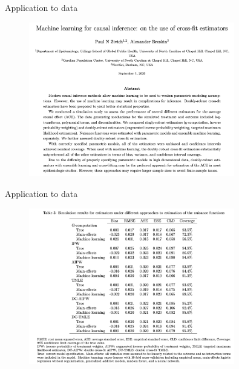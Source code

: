 \documentclass[xcolor={table}]{beamer}
\begin{document}
\begin{frame}{Application to data}
\cite{zivich2021machine}

\begin{figure}
\centering
\includegraphics[width = 0.8\textwidth]{../assets/zivich-breskin.png}
\end{figure}
\hfill
\end{frame}



\begin{frame}{Application to data}
\cite{zivich2021machine}

\begin{figure}
\centering
\includegraphics[width = 0.8\textwidth]{../assets/zivich-breskin_table3.png}
\end{figure}
\hfill
\end{frame}
\end{document}
